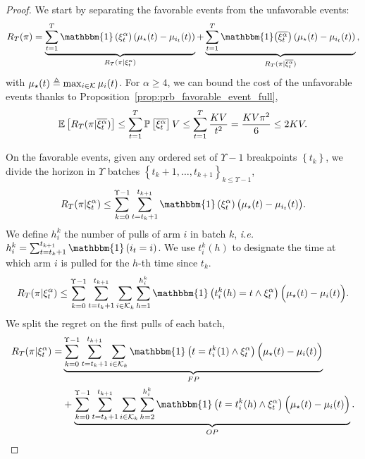 \begin{proof}
We start by separating the favorable events from the unfavorable events:
\begin{equation}
\label{eq:event_sep}
    R_T(\pi) = \underbrace{\sum_{t=1}^T \mathbbm{1}\pa{\HPevent} \pa{\mu_{\star}(t) - \mu_{i_t}(t)}}_{R_T(\pi | \HPevent)} + \underbrace{\sum_{t=1}^T \mathbbm{1}\big(\bar{\HPevent}\big) \pa{\mu_{\star}(t) - \mu_{i_t}(t)}}_{{R_T(\pi | \bar{\HPevent})}} \,,
\end{equation}
with $\mu_\star(t) \triangleq \max_{i\in\mathcal{K}}\mu_i(t)$. For $\alpha \geq 4$, we can bound the cost of the unfavorable events thanks to Proposition~\ref{prop:prb_favorable_event_full},
\begin{equation}
\label{eq:bad_event}
    \mathbb{E}\left[R_T(\pi | \overline{\xi^\alpha_t})\right] \leq \sum_{t=1}^T \mathbb{P}\left[\overline{\xi^\alpha_t}\right] V  \leq \sum_{t=1}^T \frac{KV}{t^2} = \frac{KV\pi^2}{6} \leq 2KV.
\end{equation}

On the favorable events, given any ordered set of $\Upsilon -1$ breakpoints $\left\{t_k\right\}$, we divide the horizon in $\Upsilon$ batches $\left\{t_k+1, \dots, t_{k+1} \right\}_{k \leq \Upsilon-1}$, 
\[
R_T(\pi | \HPevent) \leq \sum_{k=0}^{\Upsilon-1} \sum_{t=t_{k} +1 }^{t_{k+1}} \mathbbm{1}\pa{\HPevent} \big(\mu_{\star}(t) - \mu_{i_t}(t)\big).
\]
We define $h_{i}^{k}$ the number of pulls of arm $i$ in batch $k$, \textit{i.e.}  $h_{i}^{k} = \sum_{t=t_k +1}^{t_{k+1}} \mathbbm{1}\left(i_{t} = i\right)$. We use $t_i^k(h)$ to designate the time at which arm $i$ is pulled for the $h$-th time since $t_k$.
\[
R_T(\pi | \HPevent) \leq \sum_{k=0}^{\Upsilon-1} \sum_{t=t_k +1 }^{t_{k+1}} \sum_{i\in\arms_k} \sum_{h=1}^{h^k_{i}} \mathbbm{1}\pa{t_i^k(h) = t \land \HPevent} \Big(\mu_{\star}(t) - \mu_{i}(t)\Big).
\]
We split the regret on the first pulls of each batch,
\begin{align}
\label{eq:fp_op}
\begin{split}
    R_T(\pi | \HPevent) = & \underbrace{\sum_{k=0}^{\Upsilon-1}\sum_{t=t_{k} +1 }^{t_{k+1}} \sum_{i\in\arms_k} \mathbbm{1}\pa{t = t_i^k(1) \land \HPevent}\Big(\mu_{\star}(t) - \mu_{i}(t)\Big)}_{FP} \\ & +  \underbrace{\sum_{k=0}^{\Upsilon-1}\sum_{t=t_{k} +1 }^{t_{k+1}} \sum_{i\in\arms_k} \sum_{h=2}^{h^k_{i}}\mathbbm{1}\left( t = t_i^k(h) \land \HPevent \right)\Big( \mu_{\star}(t) - \mu_{i}(t)\Big)}_{OP} .
\end{split}
\end{align}


\end{proof}
